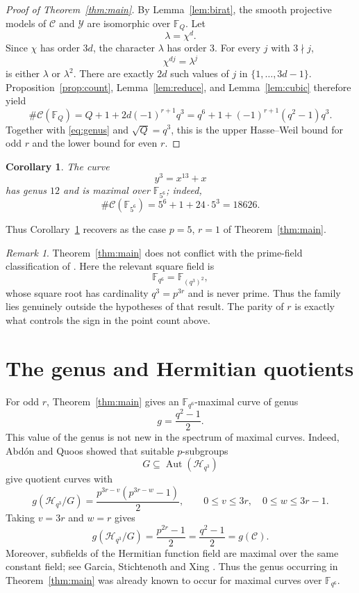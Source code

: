\documentclass[3p,10pt]{elsarticle}
\newtheorem{corollary}[theorem]{Corollary}
\theoremstyle{remark}
\newtheorem{remark}[theorem]{Remark}
\newcommand{\cC}{\mathcal{C}}
\newcommand{\cY}{\mathcal{Y}}
\newcommand{\F}{\mathbb{F}}
\begin{document}
\begin{proof}[Proof of Theorem~\ref{thm:main}]
By Lemma~\ref{lem:birat}, the smooth projective models of $\cC$ and $\cY$ are isomorphic over $\F_Q$. Let
\[
\lambda=\chi^d.
\]
Since $\chi$ has order $3d$, the character $\lambda$ has order $3$. For every $j$ with $3\nmid j$,
\[
\chi^{dj}=\lambda^j
\]
is either $\lambda$ or $\lambda^2$. There are exactly $2d$ such values of $j$ in $\{1,\ldots,3d-1\}$. Proposition~\ref{prop:count}, Lemma~\ref{lem:reduce}, and Lemma~\ref{lem:cubic} therefore yield
\[
\#\cC(\F_Q)
=
Q+1+2d(-1)^{r+1}q^3
=
q^6+1+(-1)^{r+1}(q^2-1)q^3.
\]
Together with \eqref{eq:genus} and $\sqrt Q=q^3$, this is the upper Hasse--Weil bound for odd $r$ and the lower bound for even $r$.
\end{proof}

\begin{corollary}\label{cor:q5}
The curve
\[
y^3=x^{13}+x
\]
has genus $12$ and is maximal over $\F_{5^6}$; indeed,
\[
\#\cC(\F_{5^6})=5^6+1+24\cdot 5^3=18626.
\]
\end{corollary}

Thus Corollary~\ref{cor:q5} recovers \cite[Remark~3.8]{DiasTafazolian2025} as the case $p=5$, $r=1$ of Theorem~\ref{thm:main}.

\begin{remark}
Theorem~\ref{thm:main} does not conflict with the prime-field classification of \cite{TafazolianTorres2014}. Here the relevant square field is
\[
\F_{q^6}=\F_{(q^3)^2},
\]
whose square root has cardinality $q^3=p^{3r}$ and is never prime. Thus the family lies genuinely outside the hypotheses of that result. The parity of $r$ is exactly what controls the sign in the point count above.
\end{remark}

\section{The genus and Hermitian quotients}\label{sec:hermitian}

For odd $r$, Theorem~\ref{thm:main} gives an $\F_{q^6}$-maximal curve of genus
\[
g=\frac{q^2-1}{2}.
\]
This value of the genus is not new in the spectrum of maximal curves. Indeed, Abd\'on and Quoos \cite{AbdonQuoos} showed that suitable $p$-subgroups
\[
G\subseteq\operatorname{Aut}(\mathcal H_{q^3})
\]
give quotient curves with
\[
g(\mathcal H_{q^3}/G)
=
\frac{p^{3r-v}(p^{3r-w}-1)}{2},
\qquad
0\le v\le 3r,
\quad
0\le w\le 3r-1.
\]
Taking $v=3r$ and $w=r$ gives
\[
g(\mathcal H_{q^3}/G)
=
\frac{p^{2r}-1}{2}
=
\frac{q^2-1}{2}
=
g(\cC).
\]
Moreover, subfields of the Hermitian function field are maximal over the same constant field; see Garcia, Stichtenoth and Xing \cite{GarciaStichtenothXing}. Thus the genus occurring in Theorem~\ref{thm:main} was already known to occur for maximal curves over $\F_{q^6}$.
\end{document}
